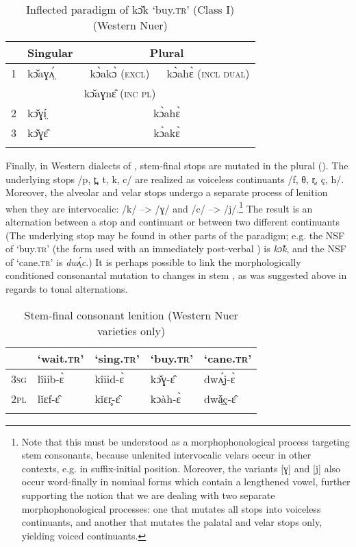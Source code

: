 \documentclass[output=paper,newtxmath,modfonts,nonflat,draftmode]{langsci/langscibook}
\begin{document}
\begin{table}
\begin{tabularx}{\textwidth}{XXll} 
\lsptoprule
& Singular & \multicolumn{2}{c}{Plural}\\
\midrule
1 & kɔ̌aɣʌ̤́ & \multicolumn{1}{c}{kɔ̀akɔ̀ (\textsc{excl})} & kɔ̀ahɛ̀ (\textsc{incl dual})\\
  &      &  kɔ̌aɣnɛ̂ (\textsc{inc pl})\\
2 & kɔ̌ɣí̤ & \multicolumn{2}{c}{kɔ̀ahɛ̀}\\
3 & kɔ̌ɣɛ̂ & \multicolumn{2}{c}{kɔ̀akɛ̀}\\
\lspbottomrule
\end{tabularx}
\caption{Inflected paradigm of kɔ̌k ‘buy.\textsc{tr}’ (Class I) (Western Nuer)}
\label{tab:monich:10}
\end{table}

Finally, in Western dialects of , stem-final stops are mutated in the plural (). The underlying stops /p, t̪, t, k, c/ are realized as voiceless continuants /f, θ, r̥, ç, h/. Moreover, the alveolar and velar stops undergo a separate process of lenition when they are intervocalic: /k/ --> /ɣ/ and /c/ --> /j/.\footnote{Note\label{fn:monich:8} that this must be understood as a morphophonological process targeting stem consonants, because unlenited intervocalic velars occur in other contexts, e.g. in suffix-initial position. Moreover, the variants [ɣ] and [j] also occur word-finally in nominal forms which contain a lengthened vowel, further supporting the notion that we are dealing with two separate morphophonological  processes: one that mutates all stops into voiceless continuants, and another that mutates the palatal and velar stops only, yielding voiced continuants.} The result is an alternation between a stop and continuant or between two different continuants (The underlying stop may be found in other parts of the paradigm; e.g. the NSF of ‘buy.\textsc{tr}’ (the form used with an immediately post-verbal ) is \textit{kɔ̂k}, and the NSF of ‘cane.\textsc{tr}’ is \textit{dwʌ̤́c}.) It is perhaps possible to link the morphologically conditioned consonantal mutation to changes in stem , as was suggested above in regards to tonal alternations.

\begin{table}
\begin{tabularx}{\textwidth}{XXXXX} 
\lsptoprule
& ‘wait.\textsc{tr}’ & ‘sing.\textsc{tr}’ & ‘buy.\textsc{tr}’ & ‘cane.\textsc{tr}’\\
\midrule
3\textsc{sg} & lîiib-ɛ̀ & kîiid-ɛ̀ & kɔ̌ɣ-ɛ̂ & dwʌ̤́j-ɛ̀\\
2\textsc{pl} & lǐɛf-ɛ̂ & kǐɛr̥-ɛ̂ & kɔàh-ɛ̀ & dwǎ̤ç-ɛ̂\\
\lspbottomrule
\end{tabularx}
\caption{Stem-final consonant lenition (Western Nuer varieties only)}
\label{tab:monich:11}
\end{table}
\end{document}
